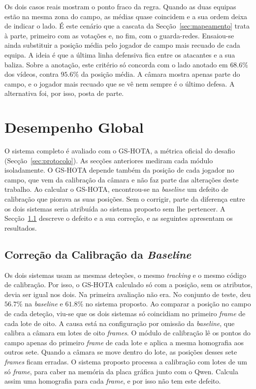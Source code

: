 Os dois casos reais mostram o ponto fraco da regra. Quando as duas equipas estão na mesma zona do campo, as médias quase coincidem e a sua ordem deixa de indicar o lado. É este cenário que a cascata da Secção~\ref{sec:mapeamento} trata à parte, primeiro com as votações e, no fim, com o guarda-redes. Ensaiou-se ainda substituir a posição média pelo jogador de campo mais recuado de cada equipa. A ideia é que a última linha defensiva fica entre os atacantes e a sua baliza. Sobre a anotação, este critério só concorda com o lado anotado em $68.6\%$ dos vídeos, contra $95.6\%$ da posição média. A câmara mostra apenas parte do campo, e o jogador mais recuado que se vê nem sempre é o último defesa. A alternativa foi, por isso, posta de parte.

\section{Desempenho Global}\label{sec:desempenho_global}\label{sec:desempenho-global}

O sistema completo é avaliado com o GS-HOTA, a métrica oficial do desafio (Secção~\ref{sec:protocolo}). As secções anteriores mediram cada módulo isoladamente. O GS-HOTA depende também da posição de cada jogador no campo, que vem da calibração da câmara e não faz parte das alterações deste trabalho. Ao calcular o GS-HOTA, encontrou-se na \emph{baseline} um defeito de calibração que piorava as suas posições. Sem o corrigir, parte da diferença entre os dois sistemas seria atribuída ao sistema proposto sem lhe pertencer. A Secção~\ref{sec:res_calib_defeito} descreve o defeito e a sua correção, e as seguintes apresentam os resultados.

\subsection{Correção da Calibração da \emph{Baseline}}\label{sec:res_calib_defeito}

Os dois sistemas usam as mesmas deteções, o mesmo \emph{tracking} e o mesmo código de calibração. Por isso, o GS-HOTA calculado só com a posição, sem os atributos, devia ser igual nos dois. Na primeira avaliação não era. No conjunto de teste, deu $56.7\%$ na \emph{baseline} e $61.8\%$ no sistema proposto. Ao comparar a posição no campo de cada deteção, viu-se que os dois sistemas só coincidiam no primeiro \emph{frame} de cada lote de oito. A causa está na configuração por omissão da \emph{baseline}, que calibra a câmara em lotes de oito \emph{frames}. O módulo de calibração lê os pontos do campo apenas do primeiro \emph{frame} de cada lote e aplica a mesma homografia aos outros sete. Quando a câmara se move dentro do lote, as posições desses sete \emph{frames} ficam erradas. O sistema proposto processa a calibração com lotes de um só \emph{frame}, para caber na memória da placa gráfica junto com o Qwen. Calcula assim uma homografia para cada \emph{frame}, e por isso não tem este defeito.

